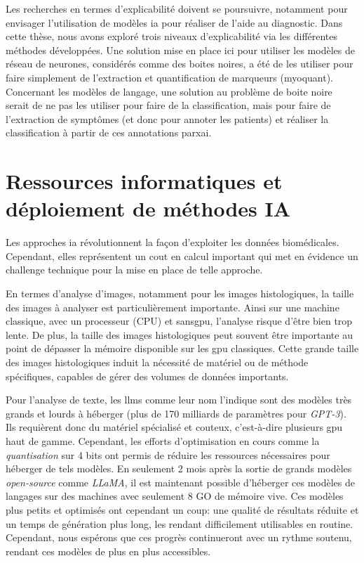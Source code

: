 Les recherches en termes d'explicabilité doivent se poursuivre, notamment pour envisager l'utilisation de modèles \gls{ia} pour réaliser de l'aide au diagnostic. Dans cette thèse, nous avons exploré trois niveaux d'explicabilité via les différentes méthodes développées. Une solution mise en place ici pour utiliser les modèles de réseau de neurones, considérés comme des boites noires, a été de les utiliser pour faire simplement de l'extraction et quantification de marqueurs (\gls{myoquant}). Concernant les modèles de langage, une solution au problème de boite noire serait de ne pas les utiliser pour faire de la classification, mais pour faire de l'extraction de symptômes (et donc pour annoter les patients) et réaliser la classification à partir de ces annotations par\gls{xai}.

\section{Ressources informatiques et déploiement de méthodes IA}
Les approches \gls{ia} révolutionnent la façon d'exploiter les données biomédicales. Cependant, elles représentent un cout en calcul important qui met en évidence un challenge technique pour la mise en place de telle approche.

En termes d'analyse d'images, notamment pour les images histologiques, la taille des images à analyser est particulièrement importante. Ainsi sur une machine classique, avec un processeur (CPU) et sans\gls{gpu}, l'analyse risque d'être bien trop lente. De plus, la taille des images histologiques peut souvent être importante au point de dépasser la mémoire disponible sur les \gls{gpu} classiques. Cette grande taille des images histologiques induit la nécessité de matériel ou de méthode spécifiques, capables de gérer des volumes de données importants.

Pour l'analyse de texte, les \gls{llms} comme leur nom l'indique sont des modèles très grands et lourds à héberger (plus de 170 milliards de paramètres pour \textit{GPT-3}). Ils requièrent donc du matériel spécialisé et couteux, c'est-à-dire plusieurs \gls{gpu} haut de gamme. Cependant, les efforts d'optimisation en cours comme la \textit{quantisation} sur 4 bits ont permis de réduire les ressources nécessaires pour héberger de tels modèles. En seulement 2 mois après la sortie de grands modèles \textit{open-source} comme \textit{LLaMA}, il est maintenant possible d'héberger ces modèles de langages sur des machines avec seulement 8 GO de mémoire vive. Ces modèles plus petits et optimisés ont cependant un coup: une qualité de résultats réduite et un temps de génération plus long, les rendant difficilement utilisables en routine. Cependant, nous espérons que ces progrès continueront avec un rythme soutenu, rendant ces modèles de plus en plus accessibles.

